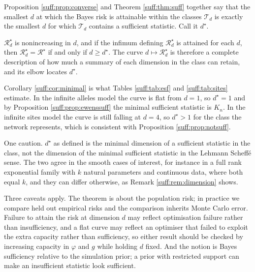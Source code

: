 Proposition \ref{suff:prop:converse} and Theorem \ref{suff:thm:suff} together say that the
smallest $d$ at which the Bayes risk is attainable within the classes $\mathcal{T}_d$ is
exactly the smallest $d$ for which $\mathcal{T}_d$ contains a sufficient statistic. Call it
$d^\star$.

\begin{corollary}
\label{suff:cor:minimal}
$\mathcal{R}^\star_d$ is nonincreasing in $d$, and if the infimum defining
$\mathcal{R}^\star_d$ is attained for each $d$, then $\mathcal{R}^\star_d=\mathcal{R}^\star$ if
and only if $d\ge d^\star$. The curve $d\mapsto \mathcal{R}^\star_d$ is therefore a complete
description of how much a summary of each dimension in the class can retain, and its elbow
locates $d^\star$.
\end{corollary}

Corollary \ref{suff:cor:minimal} is what Tables \ref{suff:tab:esf} and \ref{suff:tab:sites}
estimate. In the infinite alleles model the curve is flat from $d=1$, so $d^\star=1$ and by
Proposition \ref{suff:prop:ewenssuff} the minimal sufficient statistic is $K_n$. In the
infinite sites model the curve is still falling at $d=4$, so $d^\star>1$ for the class the
network represents, which is consistent with Proposition \ref{suff:prop:notsuff}.

One caution. $d^\star$ as defined is the minimal dimension of a sufficient statistic in the
class, not the dimension of the minimal sufficient statistic in the Lehmann Scheff\'e sense.
The two agree in the smooth cases of interest, for instance in a full rank exponential family
with $k$ natural parameters and continuous data, where both equal $k$, and they can differ
otherwise, as Remark \ref{suff:rem:dimension} shows.

\begin{remark}[Caveats]
\label{suff:rem:caveats}
Three caveats apply. The theorem is about the population risk; in practice we compare held out empirical
risks and the comparison inherits Monte Carlo error. Failure to attain the risk at dimension
$d$ may reflect optimisation failure rather than insufficiency, and a flat curve may reflect an optimiser that failed to exploit the extra capacity rather than sufficiency, so either result should
be checked by increasing capacity in $\varphi$ and $g$ while holding $d$ fixed. And the
notion is Bayes sufficiency relative to the simulation prior; a prior with restricted
support can make an insufficient statistic look sufficient.
\end{remark}

